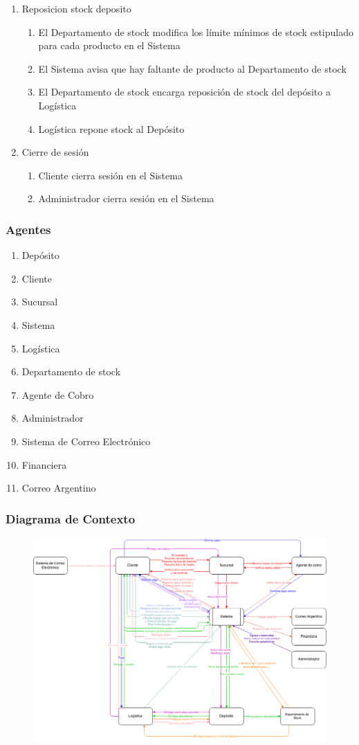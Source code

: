 \begin{enumerate}
 \item Reposicion stock deposito
  \begin{enumerate}
    \item El Departamento de stock modifica los límite m\'inimos de stock estipulado para cada producto en el Sistema
    \item El Sistema avisa que hay faltante de producto al Departamento de stock
    \item El Departamento de stock encarga reposición de stock del depósito a Logística
    \item Logística repone stock al Depósito
  \end{enumerate}

 \item Cierre de sesi\'on
  \begin{enumerate}
    \item Cliente cierra sesión en el Sistema
    \item Administrador	cierra sesión en el Sistema
  \end{enumerate}
\end{enumerate}


\subsubsection{Agentes}

\begin{enumerate}
  \item Depósito
  \item Cliente
  \item Sucursal
  \item Sistema
  \item Logística
  \item Departamento de stock 
  \item Agente de Cobro
  \item Administrador
  \item Sistema de Correo Electrónico
  \item Financiera
  \item Correo Argentino
\end{enumerate}

\subsubsection{Diagrama de Contexto}

\begin{figure}[H]
  \includegraphics[width=\linewidth]{images/contexto.png}
\end{figure}

